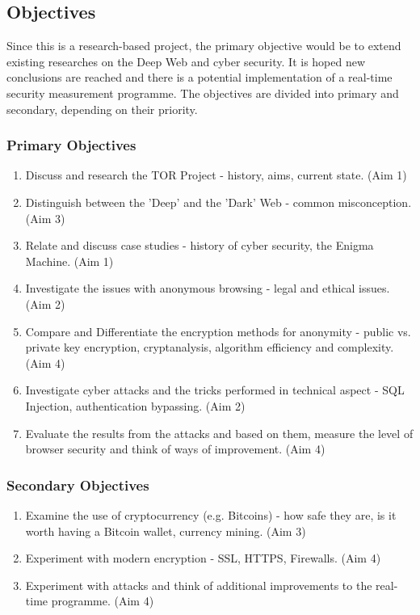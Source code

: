 \documentclass[a4paper, 12pt, titlepage]{article}
\begin{document}
\subsection{Objectives}
Since this is a research-based project, the primary objective would be to extend existing researches on the Deep Web and cyber security. It is hoped new conclusions are reached and there is a potential implementation of a real-time security measurement programme. The objectives are divided into primary and secondary, depending on their priority.
\subsubsection{Primary Objectives}
\begin{enumerate}
\item{Discuss and research the TOR Project - history, aims, current state. (Aim 1)}
\item{Distinguish between the 'Deep' and the 'Dark' Web - common misconception. (Aim 3)}
\item{Relate and discuss case studies - history of cyber security, the Enigma Machine. (Aim 1)}
\item{Investigate the issues with anonymous browsing - legal and ethical issues. (Aim 2)}
\item{Compare and Differentiate the encryption methods for anonymity - public vs. private key encryption, cryptanalysis, algorithm efficiency and complexity. (Aim 4)}
\item{Investigate cyber attacks and the tricks performed in technical aspect - SQL Injection, authentication bypassing. (Aim 2)}
\item{Evaluate the results from the attacks and based on them, measure the level of browser security and think of ways of improvement. (Aim 4)}
\end{enumerate}

\subsubsection{Secondary Objectives}
\begin{enumerate}
\item{Examine the use of cryptocurrency (e.g. Bitcoins) - how safe they are, is it worth having a Bitcoin wallet, currency mining. (Aim 3)}
\item{Experiment with modern encryption - SSL, HTTPS, Firewalls. (Aim 4)}
\item{Experiment with attacks and think of additional improvements to the real-time programme. (Aim 4)}
\end{enumerate}
\end{document}
